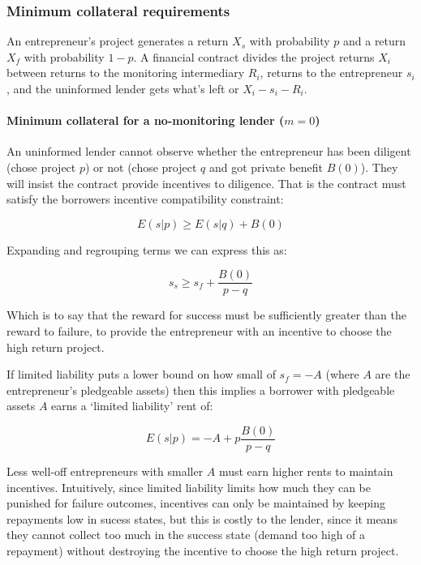 \documentclass[11pt]{article}
\begin{document}
    \subsubsection{Minimum collateral
requirements}\label{minimum-collateral-requirements}

An entrepreneur's project generates a return \(X_s\) with probability
\(p\) and a return \(X_f\) with probability \(1-p\). A financial
contract divides the project returns \(X_i\) between returns to the
monitoring intermediary \(R_i\), returns to the entrepreneur \(s_i\),
and the uninformed lender gets what's left or \(X_i-s_i-R_i\).

    \paragraph{\texorpdfstring{Minimum collateral for a no-monitoring lender
(\(m=0\))}{Minimum collateral for a no-monitoring lender (m=0)}}\label{minimum-collateral-for-a-no-monitoring-lender-m0}

An uninformed lender cannot observe whether the entrepreneur has been
diligent (chose project \(p\)) or not (chose project \(q\) and got
private benefit \(B(0)\)). They will insist the contract provide
incentives to diligence. That is the contract must satisfy the borrowers
incentive compatibility constraint:

\[E(s|p) \ge E(s|q) + B(0)\]

Expanding and regrouping terms we can express this as:

\[s_s  \ge s_f + \frac{B(0)}{p-q}\]

Which is to say that the reward for success must be sufficiently greater
than the reward to failure, to provide the entrepreneur with an
incentive to choose the high return project.

If limited liability puts a lower bound on how small of \(s_f=-A\)
(where \(A\) are the entrepreneur's pledgeable assets) then this implies
a borrower with pledgeable assets \(A\) earns a `limited liability' rent
of:

    \[E(s|p)= -A + p\frac{B(0)}{p-q}\]

    Less well-off entrepreneurs with smaller \(A\) must earn higher rents to
maintain incentives. Intuitively, since limited liability limits how
much they can be punished for failure outcomes, incentives can only be
maintained by keeping repayments low in sucess states, but this is
costly to the lender, since it means they cannot collect too much in the
success state (demand too high of a repayment) without destroying the
incentive to choose the high return project.
\end{document}
